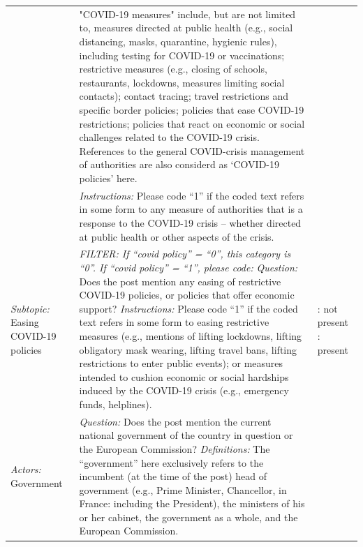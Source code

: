 \documentclass[
]{ccr}
\begin{document}
{\begin{spacing}{1}
\begin{longtable}[]{@{}
  >{\raggedright\arraybackslash}p{.14\linewidth}
  >{\raggedright\arraybackslash}p{.62\linewidth}
  >{\raggedright\arraybackslash}p{.13\linewidth}@{}}
\\
&
"COVID-19 measures" include, but are not limited to, measures directed at public health (e.g., social distancing, masks, quarantine, hygienic rules), including testing for COVID-19 or vaccinations; restrictive measures (e.g., closing of schools, restaurants, lockdowns, measures limiting social contacts); contact tracing; travel restrictions and specific border policies; policies that ease COVID-19 restrictions; policies that react on economic or social challenges related to the COVID-19 crisis. References to the general COVID-crisis management of authorities are also considerd as ‘COVID-19 policies’ here. \newline
& 
\\
&
\emph{Instructions:} \newline Please code “1” if the coded text refers in some form to any measure of authorities that is a response to the COVID-19 crisis – whether directed at public health or other aspects of the crisis. 
& 
\\
\emph{Subtopic:}
Easing COVID-19 policies
&
\emph{FILTER:  If “covid policy” = “0”, this category is  “0”. \newline 
If “covid policy” = “1”, please code:} \newline \newline 
\emph{Question:} \newline Does the post mention any easing of restrictive COVID-19 policies, or policies that offer economic support? \newline \newline
\emph{Instructions:} \newline Please code “1” if the coded text refers in some form to easing restrictive measures (e.g., mentions of lifting lockdowns, lifting obligatory mask wearing, lifting travel bans, lifting restrictions to enter public events); or measures intended to cushion economic or social hardships induced by the COVID-19 crisis (e.g., emergency funds, helplines). \newline
& 
0: not present \newline
1: present
\\ 
\emph{Actors:}
Government
&
\emph{Question:} \newline Does the post mention the current national government of the country in question or the European Commission? \newline \newline
\emph{Definitions:} \newline
The “government” here exclusively refers to the incumbent (at the time of the post) head of government (e.g., Prime Minister, Chancellor, in France: including the President), the ministers of his or her cabinet, the government as a whole, and the European Commission. 

\end{longtable}
\end{spacing}}
\end{document}
